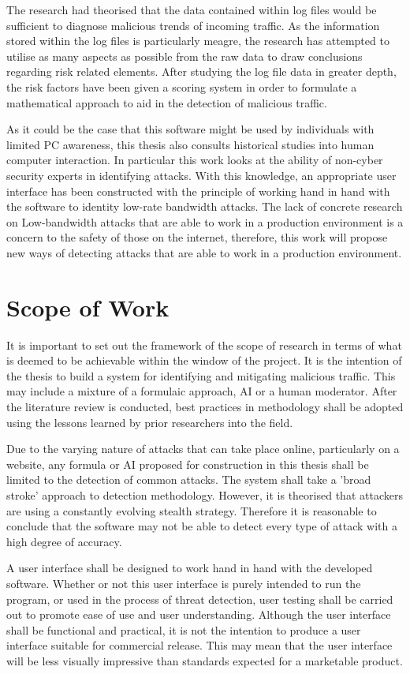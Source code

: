 The research had theorised that the data contained within log files would be sufficient to diagnose malicious trends of incoming traffic. As the information stored within the log files is particularly meagre, the research has attempted to utilise as many aspects as possible from the raw data to draw conclusions regarding risk related elements. After studying the log file data in greater depth, the risk factors have been given a scoring system in order to formulate a mathematical approach to aid in the detection of malicious traffic. 

As it could be the case that this software might be used by individuals with limited PC awareness, this thesis also consults historical studies into human computer interaction. In particular this work looks at the ability of non-cyber security experts in identifying attacks. With this knowledge, an appropriate user interface has been constructed with the principle of working hand in hand with the software to identity low-rate bandwidth attacks. The lack of concrete research on Low-bandwidth attacks that are able to work in a production environment is a concern to the safety of those on the internet, therefore, this work will propose new ways of detecting attacks that are able to work in a production environment.

\section{Scope of Work}

It is important to set out the framework of the scope of research in terms of what is deemed to be achievable within the window of the project. It is the intention of the thesis to build a system for identifying and mitigating malicious traffic. This may include a mixture of a formulaic approach, AI or a human moderator. After the literature review is conducted, best practices in methodology shall be adopted using the lessons learned by prior researchers into the field.

Due to the varying nature of attacks that can take place online, particularly on a website, any formula or AI proposed for construction in this thesis shall be limited to the detection of common attacks. The system shall take a 'broad stroke' approach to detection methodology. However, it is theorised that attackers are using a constantly evolving stealth strategy. Therefore it is reasonable to conclude that the software may not be able to detect every type of attack with a high degree of accuracy.

A user interface shall be designed to work hand in hand with the developed software. Whether or not this user interface is purely intended to run the program, or used in the process of threat detection, user testing shall be carried out to promote ease of use and user understanding. Although the user interface shall be functional and practical, it is not the intention to produce a user interface suitable for commercial release. This may mean that the user interface will be less visually impressive than standards expected for a marketable product.
